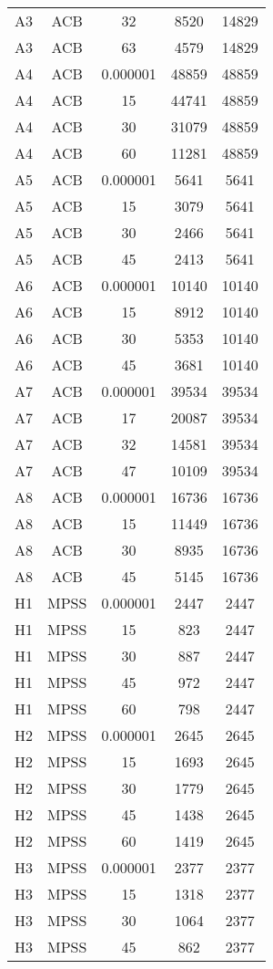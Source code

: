 \begin{center}
\begin{longtable}{ccccc}
A3	&	ACB	&	32	&	8520	&	14829	\\
A3	&	ACB	&	63	&	4579	&	14829	\\
A4	&	ACB	&	0.000001	&	48859	&	48859	\\
A4	&	ACB	&	15	&	44741	&	48859	\\
A4	&	ACB	&	30	&	31079	&	48859	\\
A4	&	ACB	&	60	&	11281	&	48859	\\
A5	&	ACB	&	0.000001	&	5641	&	5641	\\
A5	&	ACB	&	15	&	3079	&	5641	\\
A5	&	ACB	&	30	&	2466	&	5641	\\
A5	&	ACB	&	45	&	2413	&	5641	\\
A6	&	ACB	&	0.000001	&	10140	&	10140	\\
A6	&	ACB	&	15	&	8912	&	10140	\\
A6	&	ACB	&	30	&	5353	&	10140	\\
A6	&	ACB	&	45	&	3681	&	10140	\\
A7	&	ACB	&	0.000001	&	39534	&	39534	\\
A7	&	ACB	&	17	&	20087	&	39534	\\
A7	&	ACB	&	32	&	14581	&	39534	\\
A7	&	ACB	&	47	&	10109	&	39534	\\
A8	&	ACB	&	0.000001	&	16736	&	16736	\\
A8	&	ACB	&	15	&	11449	&	16736	\\
A8	&	ACB	&	30	&	8935	&	16736	\\
A8	&	ACB	&	45	&	5145	&	16736	\\
H1	&	MPSS	&	0.000001	&	2447	&	2447	\\
H1	&	MPSS	&	15	&	823	&	2447	\\
H1	&	MPSS	&	30	&	887	&	2447	\\
H1	&	MPSS	&	45	&	972	&	2447	\\
H1	&	MPSS	&	60	&	798	&	2447	\\
H2	&	MPSS	&	0.000001	&	2645	&	2645	\\
H2	&	MPSS	&	15	&	1693	&	2645	\\
H2	&	MPSS	&	30	&	1779	&	2645	\\
H2	&	MPSS	&	45	&	1438	&	2645	\\
H2	&	MPSS	&	60	&	1419	&	2645	\\
H3	&	MPSS	&	0.000001	&	2377	&	2377	\\
H3	&	MPSS	&	15	&	1318	&	2377	\\
H3	&	MPSS	&	30	&	1064	&	2377	\\
H3	&	MPSS	&	45	&	862	&	2377	\\

\end{longtable}
\end{center}

